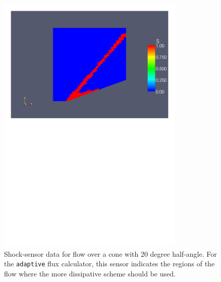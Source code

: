 \begin{figure}[htbp]
\begin{center}
\includegraphics[width=0.8\textwidth, viewport=24 447 571 819]{../2D/cone20-udf/cone20_S.pdf}
\end{center}
\caption{Shock-sensor data for flow over a cone with 20 degree half-angle.
         For the \texttt{adaptive} flux calculator, 
	 this sensor indicates the regions
	 of the flow where the more dissipative scheme should be used.}
\label{cone20-udf-shock-sensor-fig}
\end{figure}

